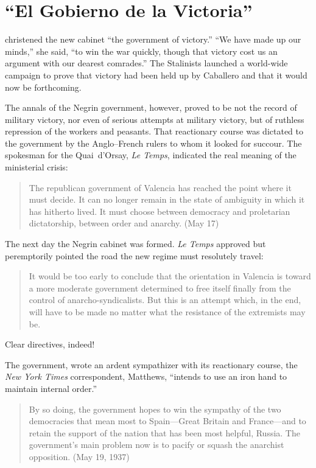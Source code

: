 \chapter{``El Gobierno de la Victoria''}

 christened the new cabinet ``the government of victory.'' ``We have made up our minds,'' she said, ``to win the war quickly, though that victory cost us an argument with our dearest comrades.'' The Stalinists launched a world-wide campaign to prove that victory had been held up by Caballero and that it would now be forthcoming.

The annals of the Negrin government, however, proved to be not the record of military victory, nor even of serious attempts at military victory, but of ruthless repression of the workers and peasants. That reactionary course was dictated to the government by the Anglo--French rulers to whom it looked for succour. The spokesman for the Quai~d’Orsay, \emph{Le Temps}, indicated the real meaning of the ministerial crisis:

\begin{quotation}
  The republican government of Valencia has reached the point where it must decide. It can no longer remain in the state of ambiguity in which it has hitherto lived. It must choose between democracy and proletarian dictatorship, between order and anarchy. (May 17)
\end{quotation}

The next day the Negrin cabinet was formed. \emph{Le Temps} approved but peremptorily pointed the road the new regime must resolutely travel:

\begin{quotation}
  It would be too early to conclude that the orientation in Valencia is toward a more moderate government determined to free itself finally from the control of anarcho-syndicalists. But this is an attempt which, in the end, will have to be made no matter what the resistance of the extremists may be.
\end{quotation}

Clear directives, indeed!

\medskip

The government, wrote an ardent sympathizer with its reactionary course, the \emph{New York Times} correspondent, Matthews, ``intends to use an iron hand to maintain internal order.''

\begin{quotation}
  By so doing, the government hopes to win the sympathy of the two democracies that mean most to Spain---Great Britain and France---and to retain the support of the nation that has been most helpful, Russia. The government’s main problem now is to pacify or squash the anarchist opposition. (May 19, 1937)
\end{quotation}

